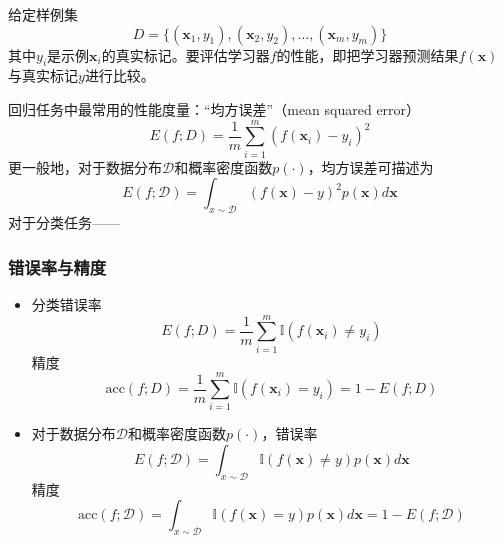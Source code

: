 \documentclass{ctexart}
\begin{document}
					给定样例集\[D=\{(\bm{x}_1,y_1),(\bm{x}_2,y_2),\dots,(\bm{x}_m,y_m)\}\]其中$y_i$是示例$\bm{x}_i$的真实标记。要评估学习器$f$的性能，即把学习器预测结果$f(\bm{x})$与真实标记$y$进行比较。
					
					回归任务中最常用的性能度量：``均方误差''（mean squared error）\[E(f;D)=\frac{1}{m}\sum_{i=1}^{m}(f(\bm{x}_i)-y_i)^2\]更一般地，对于数据分布$\mathcal{D}$和概率密度函数$p(\cdot)$，均方误差可描述为\[E(f;\mathcal{D})=\int_{x\sim\mathcal{D}}^{}(f(\bm{x})-y)^2p(\bm{x})d\bm{x}\]对于分类任务——
					\subsubsection{错误率与精度}
						\begin{itemize}
							\item 分类错误率\[E(f;D)=\frac{1}{m}\sum_{i=1}^{m}\mathbb{I}(f(\bm{x}_i)\neq y_i)\]精度\[\mathrm{acc}(f;D)=\frac{1}{m}\sum_{i=1}^{m}\mathbb{I}(f(\bm{x}_i)=y_i)=1-E(f;D)\]
							\item 对于数据分布$\mathcal{D}$和概率密度函数$p(\cdot)$，错误率\[E(f;\mathcal{D})=\int_{x\sim\mathcal{D}}^{}\mathbb{I}(f(\bm{x})\neq y)p(\bm{x})d\bm{x}\]精度\[\mathrm{acc}(f;\mathcal{D})=\int_{x\sim\mathcal{D}}^{}\mathbb{I}(f(\bm{x})=y)p(\bm{x})d\bm{x}=1-E(f;\mathcal{D})\]
						\end{itemize}
\end{document}
